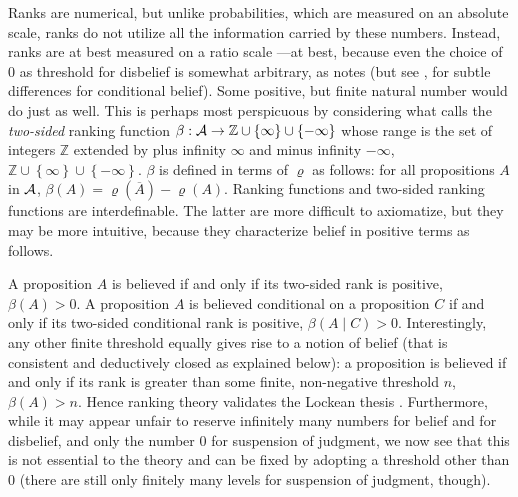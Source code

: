 Ranks are numerical, but unlike probabilities, which are measured on an absolute scale, ranks do not utilize all the information carried by these numbers. Instead, ranks are at best measured on a ratio scale \citep{hs08}---at best, because even the choice of $0$ as threshold for disbelief is somewhat arbitrary, as \citet[9]{s15} notes (but see \citealp{r18}, for subtle differences for conditional belief). Some positive, but finite natural number would do just as well. This is perhaps most perspicuous by considering what \citet{s12} calls the \emph{two-sided} ranking function $\beta:\begin{cal}A\end{cal}\rightarrow\mathbb{Z}\cup\left\{\infty\right\}\cup\left\{-\infty\right\}$ whose range is the set of integers $\mathbb{Z}$ extended by plus infinity $\infty$ and minus infinity $-\infty$, $\mathbb{Z}\cup\left\{\infty\right\}\cup\left\{-\infty\right\}$. $\beta$ is defined in terms of $\varrho$ as follows: for all propositions $A$ in $\cal A$, $\beta\left(A\right)=\varrho\left(\overline{A}\right)-\varrho\left(A\right)$. Ranking functions and two-sided ranking functions are interdefinable. The latter are more difficult to axiomatize, but they may be more intuitive, because they characterize belief in positive terms as follows.

A proposition $A$ is believed if and only if its two-sided rank is positive, $\beta\left(A\right)>0$. A proposition $A$ is believed conditional on a proposition $C$ if and only if its two-sided conditional rank is positive, $\beta\left(A\mid C\right)>0$. Interestingly, any other finite threshold equally gives rise to a notion of belief (that is consistent and deductively closed as explained below): a proposition is believed if and only if its rank is greater than some finite, non-negative threshold $n$, $\beta\left(A\right)>n$. Hence ranking theory validates the Lockean thesis \citep{f09, h09a}. Furthermore, while it may appear unfair to reserve infinitely many numbers for belief and for disbelief, and only the number $0$ for suspension of judgment, we now see that this is not essential to the theory and can be fixed by adopting a threshold other than $0$ (there are still only finitely many levels for suspension of judgment, though).

